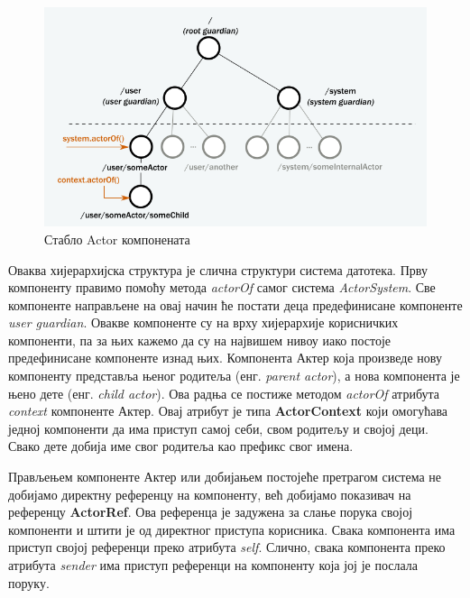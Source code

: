 \documentclass[12pt,oneside]{memoir}
\begin{document}
\begin{figure}[!ht]
  \centering
  \includegraphics[width=1\textwidth]{akkaTree.png}
  \caption{Стабло Actor компонената}
  \label{fig:stablo}
\end{figure}

Оваква хијерархијска структура је слична структури система датотека. Прву компоненту правимо помоћу метода \textit{actorOf} самог система \textit{ActorSystem}. Све компоненте направљене на овај начин ће постати деца предефинисане компоненте \textit{user guardian}. Овакве компоненте су на врху хијерархије корисничких компоненти, па за њих кажемо да су на највишем нивоу иако постоје предефинисане компоненте изнад њих. Компонента Актер која произведе нову компоненту представља њеног родитеља (енг. \textit{parent actor}), а нова компонента је њено дете (енг. \textit{child actor}). Ова радња се постиже методом \textit{actorOf} атрибута \textit{context} компоненте Актер. Овај атрибут је типа \textbf{ActorContext} који омогућава једној компоненти да има приступ самој себи, свом родитељу и својој деци. Свако дете добија име свог родитеља као префикс свог имена.

Прављењем компоненте Актер или добијањем постојеће претрагом система не добијамо директну референцу на компоненту, већ добијамо показивач на референцу \textbf{ActorRef}. Ова референца је задужена за слање порука својој компоненти и штити је од директног приступа корисника. Свака компонента има приступ својој референци преко атрибута \textit{self}. Слично, свака компонента преко атрибута \textit{sender} има приступ референци на компоненту која јој је послала поруку.
\end{document}

